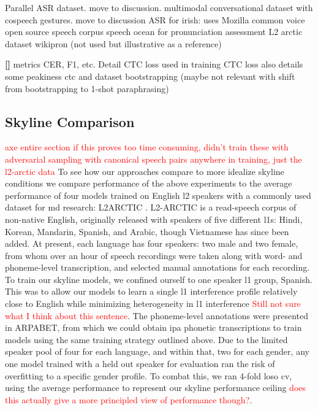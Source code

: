 \documentclass[thesis]{cluu}
\newcounter{paranum}
\newcommand{\numberedparagraph}{\par\refstepcounter{paranum}\textbf{[\theparanum] }}
\newcommand{\todo}[1]{\textcolor{red}{#1}}
\begin{document}
\textcite{conneauFLEURSFewshotLearning2022} Parallel ASR dataset. move to discussion.
\textcite{deichlerMMConvMultimodalConversational2024} multimodal conversational dataset with cospeech gestures. move to discussion
\textcite{qianAutomaticSpeechRecognition2022} ASR for irish: uses Mozilla common voice
\textcite{zhangSpeechocean762OpenSourceNonnative2021} open source speech corpus speech ocean for pronunciation assessment
\textcite{zhaoL2ARCTICNonnativeEnglish2018} L2 arctic dataset
\textcite{leeMassivelyMultilingualPronunciation} wikipron (not used but illustrative as a reference)
\numberedparagraph{metrics CER, F1, etc. Detail CTC loss used in training}
CTC loss \textcite{gravesConnectionistTemporalClassification} also details some peakiness
\textcite{kurzingerCTCSegmentationLargeCorpora2020} ctc and dataset bootstrapping (maybe not relevant with shift from bootstrapping to 1-shot paraphrasing)

\subsection{Skyline Comparison}
\todo{axe entire section if this proves too time consuming, didn't train these with adversarial sampling with canonical speech pairs anywhere in training, just the l2-arctic data} To see how our approaches compare to more idealize skyline conditions we compare performance of the above experiments to the average performance of four models trained on English \gls{l2} speakers with a commonly used dataset for \gls{md} research: L2ARCTIC \parencite{zhaoL2ARCTICNonnativeEnglish2018}. L2-ARCTIC is a read-speech corpus of non-native English, originally released with speakers of five different \glspl{l1}: Hindi, Korean, Mandarin, Spanish, and Arabic, though Vietnamese has since been added. At present, each language has four speakers: two male and two female, from whom over an hour of speech recordings were taken along with word- and phoneme-level transcription, and selected manual annotations for each recording. 
To train our skyline models, we confined ourself to one speaker \gls{l1} group, Spanish. This was to allow our models to learn a single \gls{l1} interference profile relatively close to English while minimizing heterogeneity in \gls{l1} interference \todo{Still not sure what I think about this sentence}. The phoneme-level annotations were presented in ARPABET, from which we could obtain \gls{ipa} phonetic transcriptions to train models using the same training strategy outlined above. Due to the limited speaker pool of four for each language, and within that, two for each gender, any one model trained with a held out speaker for evaluation ran the risk of overfitting to a specific gender profile. To combat this, we ran 4-fold \gls{loso} \gls{cv}, using the average performance to represent our skyline performance ceiling \todo{does this actually give a more principled view of performance though?}.
\end{document}

